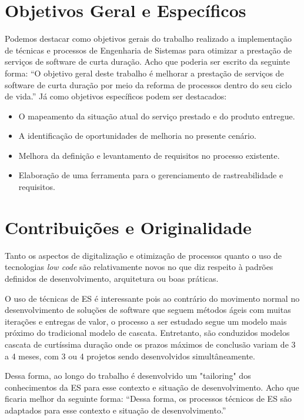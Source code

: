 	\section{Objetivos Geral e Específicos}\label{sec:introducao:objetivos}

		Podemos destacar como objetivos gerais do trabalho realizado a implementação de 
		técnicas e processos de Engenharia de Sistemas para otimizar a prestação de 
		serviços de software de curta duração. {\color{red} Acho que poderia ser escrito da seguinte forma: ``O objetivo geral deste trabalho é melhorar a prestação de serviços de software de curta duração por meio da reforma de processos dentro do seu ciclo de vida.''}
		Já como objetivos específicos podem ser destacados: 
		\begin{itemize}
			\item O mapeamento da situação atual do serviço prestado e do produto entregue.
			\item A identificação de oportunidades de melhoria no presente cenário. 
			\item Melhora da definição e levantamento de requisitos no processo existente.
			\item Elaboração de uma ferramenta para o gerenciamento de rastreabilidade e requisitos.
		\end{itemize}
 		
	\section{Contribuições e Originalidade}\label{sec:introducao:contribuicoes}

		Tanto os aspectos de digitalização e otimização de processos quanto o uso de tecnologias \textit{low code} são relativamente novos no que diz respeito à padrões definidos
		de desenvolvimento, arquitetura ou boas práticas.
	
		O uso de técnicas de ES é interessante pois ao contrário do movimento normal no desenvolvimento de soluções de software que seguem métodos ágeis com muitas iterações e entregas
		de valor, o processo a ser estudado segue um modelo mais próximo do tradicional modelo de cascata. Entretanto, são conduzidos modelos cascata de curtíssima duração onde os prazos
		máximos de conclusão variam de 3 a 4 meses, com 3 ou 4 projetos sendo desenvolvidos simultâneamente.

		Dessa forma, ao longo do trabalho é desenvolvido um "tailoring" dos conhecimentos da ES para esse contexto e situação de desenvolvimento.
		{\color{red} Acho que ficaria melhor da seguinte forma: ``Dessa forma, os processos técnicos de ES são adaptados para esse contexto e situação de desenvolvimento.''}
	
